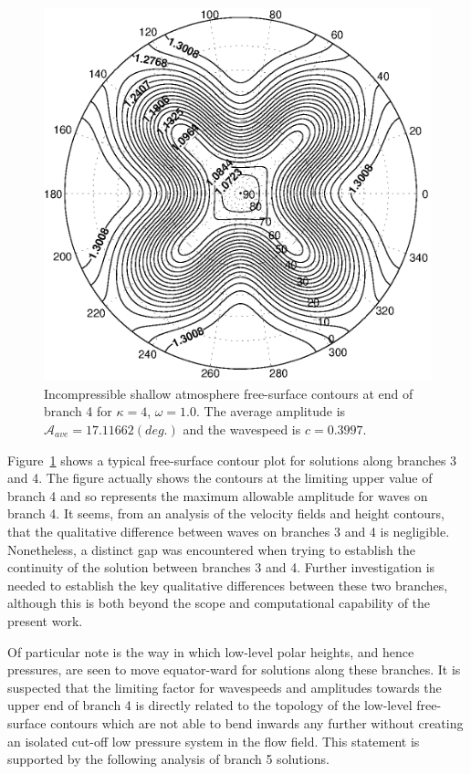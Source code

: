 \begin{figure}[htbp]
	\centering
		\includegraphics[scale=0.75]{IMAGES/k4w1fsb4end.eps}
	\caption{Incompressible shallow atmosphere free-surface contours at end of branch 4 for $\kappa=4$, $\omega=1.0$. The average amplitude is $\mathcal{A}_{ave}=17.11662 (deg.)$ and the wavespeed is $c=0.3997$.}
	\label{fig:k4w1fsb4end}
\end{figure}

Figure~\ref{fig:k4w1fsb4end} shows a typical free-surface contour plot for solutions along branches 3 and 4. The figure actually shows the contours at the limiting upper value of branch 4 and so represents the maximum allowable amplitude for waves on branch 4. It seems, from an analysis of the velocity fields and height contours, that the qualitative difference between waves on branches 3 and 4 is negligible. Nonetheless, a distinct gap was encountered when trying to establish the continuity of the solution between branches 3 and 4. Further investigation is needed to establish the key qualitative differences between these two branches, although this is both beyond the scope and computational capability of the present work.

Of particular note is the way in which low-level polar heights, and hence pressures, are seen to move equator-ward for solutions along these branches. It is suspected that the limiting factor for wavespeeds and amplitudes towards the upper end of branch 4 is directly related to the topology of the low-level free-surface contours which are not able to bend inwards any further without creating an isolated cut-off low pressure system in the flow field. This statement is supported by the following analysis of branch 5 solutions.

